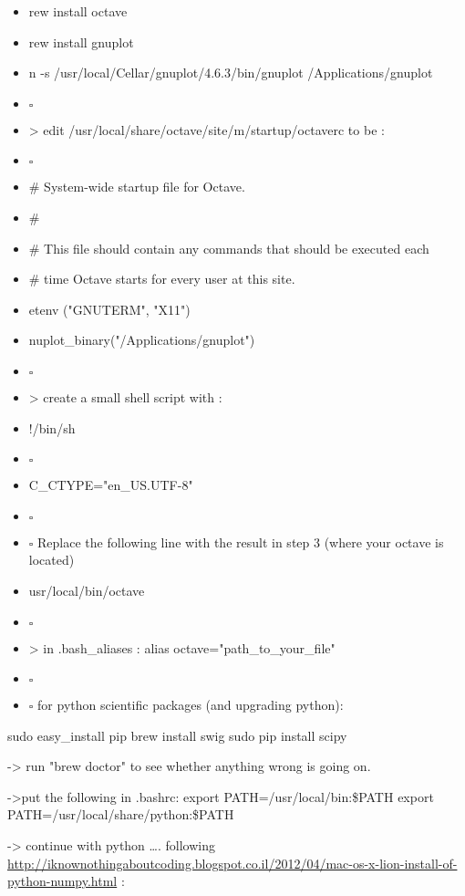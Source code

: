 \documentclass[11pt]{article}
\begin{document}
\begin{itemize}
\item\relax [ ]rew install octave
\item\relax [ ]rew install gnuplot
\item\relax [ ]n -s /usr/local/Cellar/gnuplot/4.6.3/bin/gnuplot /Applications/gnuplot
\item $\square$ 
\item\relax [ ]> edit /usr/local/share/octave/site/m/startup/octaverc to be :
\item $\square$ 
\item\relax [ ]\# System-wide startup file for Octave.
\item\relax [ ]\#
\item\relax [ ]\# This file should contain any commands that should be executed each
\item\relax [ ]\# time Octave starts for every user at this site.
\item\relax [ ]etenv ("GNUTERM", "X11")
\item\relax [ ]nuplot\_binary("/Applications/gnuplot")
\item $\square$ 
\item\relax [ ]> create a small shell script with :
\item\relax [ ]!/bin/sh
\item $\square$ 
\item\relax [ ]C\_CTYPE="en\_US.UTF-8"
\item $\square$ 
\item $\square$ Replace the following line with the result in step 3 (where your octave is located)
\item\relax [ ]usr/local/bin/octave
\item $\square$ 
\item\relax [ ]> in .bash\_aliases : alias octave="path\_to\_your\_file"
\item $\square$ 
\item $\square$ for python  scientific packages (and upgrading python):
\end{itemize}
sudo easy\_install pip
brew install swig
sudo pip install scipy

-> run "brew doctor" to see whether anything wrong is going on. 

->put the following in .bashrc:
export PATH=/usr/local/bin:\$PATH
export PATH=/usr/local/share/python:\$PATH

-> continue with python \ldots{}. following \url{http://iknownothingaboutcoding.blogspot.co.il/2012/04/mac-os-x-lion-install-of-python-numpy.html} :
\end{document}

